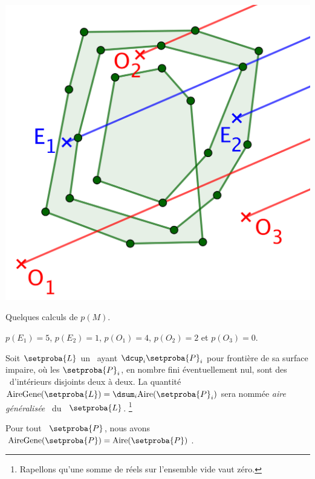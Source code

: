 \begin{center}
	\small\itshape
	\includegraphics[scale=.3]{content/polygon/at-least-one/algarea-odd-even.png}
	
	
	Quelques calculs de $p(M)$.

	\smallskip
	
	$p(E_1) = 5$,
	$p(E_2) = 1$,
	$p(O_1) = 4$,
	$p(O_2) = 2$ et
	$p(O_3) = 0$.
\end{center}


\begin{defi} \label{garea-def}
    Soit
    $\setproba{L}$ un \ncycle\
    ayant $\dcup_{i} \setproba{P}_i$ pour frontière de sa surface impaire, où les $\setproba{P}_i$, en nombre fini éventuellement nul, sont des \ngones\ d'intérieurs disjoints deux à deux.
    La quantité $\garea{\setproba{L}} = \dsum_{i} \area{\setproba{P}_i}$ sera nommée \og \emph{aire généralisée} \fg\ du \ncycle\ $\setproba{L}$.%
    \footnote{
    	Rapellons qu'une somme de réels sur l'ensemble vide vaut zéro.
    }
\end{defi}




\begin{fact}
    Pour tout \ngone\ $\setproba{P}$, nous avons
	$\garea{\setproba{P}} = \area{\setproba{P}}$.
\end{fact}


